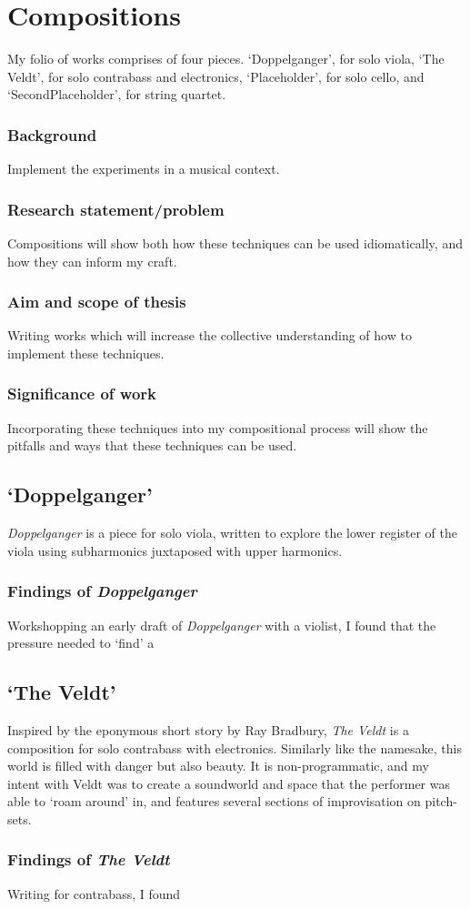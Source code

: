 
\chapter{Compositions}
My folio of works comprises of four pieces. `Doppelganger', for solo viola, `The Veldt', for solo contrabass and electronics, `Placeholder', for solo cello, and `SecondPlaceholder', for string quartet.
\subsection{Background}
Implement the experiments in a musical context.
\subsection{Research statement/problem}
Compositions will show both how these techniques can be used idiomatically, and how they can inform my craft.
\subsection{Aim and scope of thesis}
Writing works which will increase the collective understanding of how to implement these techniques.
\subsection{Significance of work}
Incorporating these techniques into my compositional process will show the pitfalls and ways that these techniques can be used.
\section{`Doppelganger'}
\emph{Doppelganger} is a piece for solo viola, written to explore the lower register of the viola using subharmonics juxtaposed with upper harmonics. 

\subsection{Findings of \emph{Doppelganger}}
Workshopping an early draft of \emph{Doppelganger} with a violist, I found that the pressure needed to `find' a  \lipsum[3]

\section{`The Veldt'}
Inspired by the eponymous short story by Ray Bradbury, \textit{The Veldt} is a composition for solo contrabass with electronics. Similarly like the namesake, this world is filled with danger but also beauty. It is non-programmatic, and my intent with Veldt was to create a soundworld and space that the performer was able to `roam around' in, and features several sections of improvisation on pitch-sets. \lipsum[1]

\subsection{Findings of \emph{The Veldt}}
Writing for contrabass, I found 
\lipsum[3]